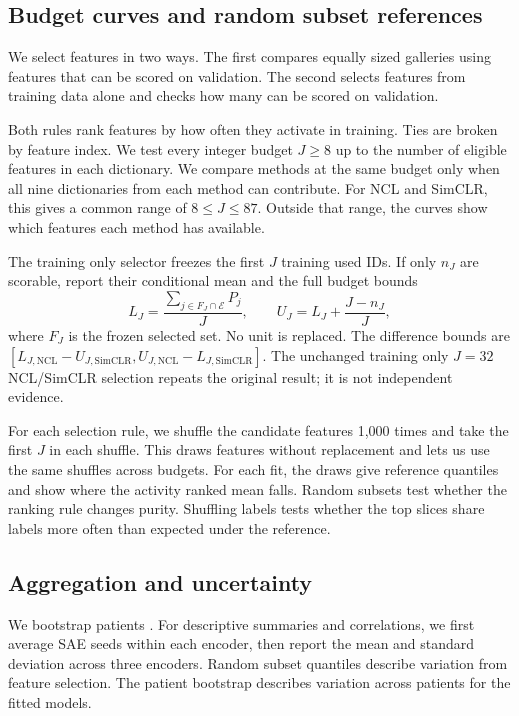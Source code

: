 \documentclass[letterpaper]{article}
\begin{document}
\subsection{Budget curves and random subset references}
We select features in two ways. The first compares equally sized galleries using features that can be scored on validation. The second selects features from training data alone and checks how many can be scored on validation.

Both rules rank features by how often they activate in training. Ties are broken by feature index. We test every integer budget $J\geq8$ up to the number of eligible features in each dictionary. We compare methods at the same budget only when all nine dictionaries from each method can contribute. For NCL and SimCLR, this gives a common range of $8\leq J\leq87$. Outside that range, the curves show which features each method has available.

The training only selector freezes the first $J$ training used IDs. If only $n_J$ are scorable, report their conditional mean and the full budget bounds
\begin{equation}
 L_J=\frac{\sum_{j\in F_J\cap\mathcal E}P_j}{J},\qquad
 U_J=L_J+\frac{J-n_J}{J},
\label{eq:bounds}
\end{equation}
where $F_J$ is the frozen selected set. No unit is replaced. The difference bounds are $[L_{J,\mathrm{NCL}}-U_{J,\mathrm{SimCLR}},U_{J,\mathrm{NCL}}-L_{J,\mathrm{SimCLR}}]$. The unchanged training only $J=32$ NCL/SimCLR selection repeats the original result; it is not independent evidence.

For each selection rule, we shuffle the candidate features 1,000 times and take the first $J$ in each shuffle. This draws features without replacement and lets us use the same shuffles across budgets. For each fit, the draws give reference quantiles and show where the activity ranked mean falls. Random subsets test whether the ranking rule changes purity. Shuffling labels tests whether the top slices share labels more often than expected under the reference.

\subsection{Aggregation and uncertainty}\label{sec:uncertainty}
We bootstrap patients \cite{efron1979bootstrap}. For descriptive summaries and correlations, we first average SAE seeds within each encoder, then report the mean and standard deviation across three encoders. Random subset quantiles describe variation from feature selection. The patient bootstrap describes variation across patients for the fitted models.
\end{document}
